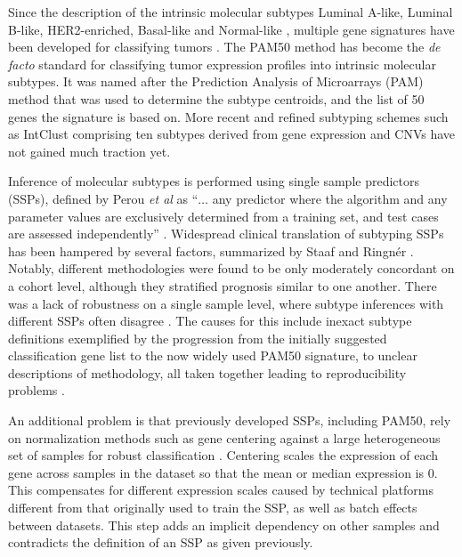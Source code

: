 \documentclass[11pt]{book}
\begin{document}
Since the description of the intrinsic molecular subtypes Luminal A-like, Luminal B-like, HER2-enriched, Basal-like and Normal-like \cite{Perou:2000, Sorlie:2003}, multiple gene signatures have been developed for classifying tumors \cite{Sorlie:2003, Hu:2006, Parker:2009, Haibe-Kains:2012, Paquet:2015-AIMS}. The PAM50 method \cite{Parker:2009} has become the \textit{de facto} standard for classifying tumor expression profiles into intrinsic molecular subtypes. It was named after the Prediction Analysis of Microarrays (PAM) \cite{Tibshirani:2002} method that was used to determine the subtype centroids, and the list of 50 genes the signature is based on. More recent and refined subtyping schemes such as IntClust \cite{Ali:2014} comprising ten subtypes derived from gene expression and CNVs have not gained much traction yet.

Inference of molecular subtypes is performed using single sample predictors (SSPs), defined by Perou \textit{et al} as ``$\ldots$ any predictor where the algorithm and any parameter values are exclusively determined from a training set, and test cases are assessed independently'' \cite{Perou:2010}. Widespread clinical translation of subtyping SSPs has been hampered by several factors, summarized by Staaf and Ringnér \cite{StaafRingner:2015}. Notably, different methodologies were found to be only moderately concordant on a cohort level, although they stratified prognosis similar to one another. There was a lack of robustness on a single sample level, where subtype inferences with different SSPs often disagree \cite{Weigelt:2010-ssp, Mackay:2011}. The causes for this include inexact subtype definitions exemplified by the progression from the initially suggested classification gene list \cite{Sorlie:2001} to the now widely used PAM50 signature, to unclear descriptions of methodology, all taken together leading to reproducibility problems \cite{Weigelt:2010-ssp, Sorlie:2010, Weigelt:2010-reply, Mackay:2011}.

An additional problem is that previously developed SSPs, including PAM50, rely on normalization methods such as gene centering against a large heterogeneous set of samples for robust classification \cite{Lusa:2007, Sorlie:2010}. Centering scales the expression of each gene across samples in the dataset so that the mean or median expression is 0. This compensates for different expression scales caused by technical platforms different from that originally used to train the SSP, as well as batch effects between datasets. This step adds an implicit dependency on other samples and contradicts the definition of an SSP as given previously.
\end{document}
